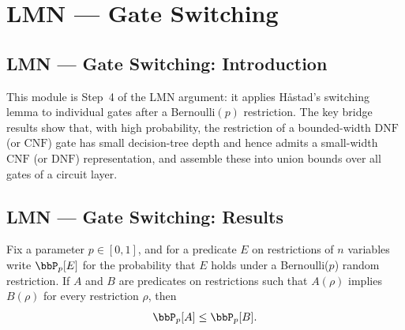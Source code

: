 \section{LMN --- Gate Switching}
\subsection*{LMN --- Gate Switching: Introduction}

This module is Step~4 of the LMN argument: it applies Håstad's switching lemma to
individual gates after a Bernoulli$(p)$ restriction. The key bridge results show that,
with high probability, the restriction of a bounded-width $\mathrm{DNF}$ (or $\mathrm{CNF}$)
gate has small decision-tree depth and hence admits a small-width $\mathrm{CNF}$ (or
$\mathrm{DNF}$) representation, and assemble these into union bounds over all gates of a
circuit layer.

\subsection*{LMN --- Gate Switching: Results}

\begin{lemma}
\label{LMN.bernoulliRestrProb_mono}
\leanok
{}
Fix a parameter $p \in [0,1]$, and for a predicate $E$ on restrictions of $n$ variables
write $\bbP_p[E]$ for the probability that $E$ holds under a Bernoulli($p$) random
restriction. If $A$ and $B$ are predicates on restrictions such that $A(\rho)$ implies
$B(\rho)$ for every restriction $\rho$, then
\[
  \bbP_p[A] \le \bbP_p[B].
\]
\end{lemma}

